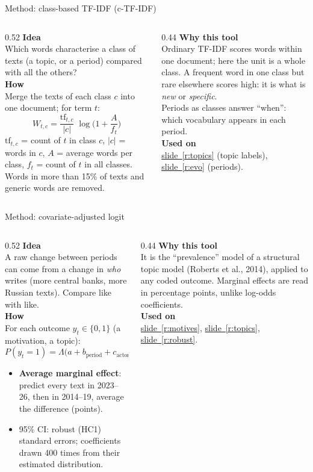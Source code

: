 \documentclass[aspectratio=169,10pt]{beamer}
\newcommand{\usedon}[1]{\hyperref[#1]{\textcolor{c4}{slide~\ref*{#1}}}}
\newcommand{\mhead}[1]{\textcolor{c1}{\textbf{#1}}\\[1pt]}
\begin{document}
\begin{frame}{Method: class-based TF-IDF (c-TF-IDF)}
\begin{columns}[T]
\begin{column}{0.52\textwidth}\footnotesize
\mhead{Idea}
Which words characterise a class of texts (a topic, or a period) compared with all the others?\\[4pt]
\mhead{How}
Merge the texts of each class $c$ into one document; for term $t$:
\[ W_{t,c} = \frac{\text{tf}_{t,c}}{|c|}\;\log\!\Big(1 + \frac{A}{f_t}\Big) \]
$\text{tf}_{t,c}$ = count of $t$ in class $c$, $|c|$ = words in $c$, $A$ = average words per class, $f_t$ = count of $t$ in all classes. Words in more than 15\% of texts and generic words are removed.
\end{column}
\begin{column}{0.44\textwidth}\footnotesize
\mhead{Why this tool}
Ordinary TF-IDF scores words within one document; here the unit is a whole class. A frequent word in one class but rare elsewhere scores high: it is what is \emph{new} or \emph{specific}.\\[3pt]
Periods as classes answer ``when'': which vocabulary appears in each period.\\[6pt]
\mhead{Used on}
\usedon{r:topics} (topic labels), \usedon{r:evo} (periods).
\end{column}
\end{columns}
\end{frame}

\begin{frame}{Method: covariate-adjusted logit}
\begin{columns}[T]
\begin{column}{0.52\textwidth}\footnotesize
\mhead{Idea}
A raw change between periods can come from a change in \emph{who} writes (more central banks, more Russian texts). Compare like with like.\\[4pt]
\mhead{How}
For each outcome $y_t \in\{0,1\}$ (a motivation, a topic):
\[ P(y_t=1) = \Lambda\big(a + b_{\text{period}} + c_{\text{actor}} + e\cdot\text{English}\big) \]
\begin{itemize}\setlength\itemsep{1pt}
\item \textbf{Average marginal effect}: predict every text in 2023--26, then in 2014--19, average the difference (points).
\item 95\% CI: robust (HC1) standard errors; coefficients drawn 400 times from their estimated distribution.
\end{itemize}
\end{column}
\begin{column}{0.44\textwidth}\footnotesize
\mhead{Why this tool}
It is the ``prevalence'' model of a structural topic model (Roberts et al., 2014), applied to any coded outcome. Marginal effects are read in percentage points, unlike log-odds coefficients.\\[6pt]
\mhead{Used on}
\usedon{r:motives}, \usedon{r:topics}, \usedon{r:robust}.
\end{column}
\end{columns}
\end{frame}
\end{document}
